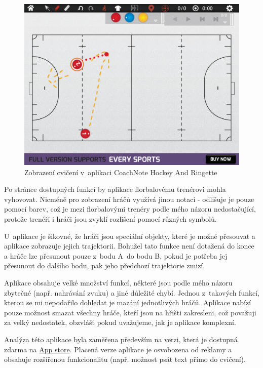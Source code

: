 \documentclass[thesis=B,czech]{FITthesis}[2012/06/26]
\begin{document}
	\begin{figure}[h!t]
		\centering
		\includegraphics[width=\textwidth]{img/competition/coachnote/IMG_0011}
		\caption{Zobrazení cvičení v~aplikaci CoachNote Hockey And Ringette}
		\label{pic:coachnote_exercises}
	\end{figure}

	Po stránce dostupných funkcí by aplikace florbalovému trenérovi mohla vyhovovat. Nicméně pro zobrazení hráčů využívá jinou notaci \-- odlišuje je pouze pomocí barev, což je mezi florbalovými trenéry podle mého názoru nedostačující, protože trenéři i hráči jsou zvyklí rozlišení pomocí různých symbolů.

	U~aplikace je šikovné, že hráči jsou speciální objekty, které je možné přesouvat a aplikace zobrazuje jejich trajektorii. Bohužel tato funkce není dotažená do konce a hráče lze přesunout pouze z~bodu A~do bodu B, pokud je potřeba jej přesunout do dalšího bodu, pak jeho předchozí trajektorie zmizí.

	Aplikace obsahuje velké množství funkcí, některé jsou podle mého názoru zbytečné (např. nahrávání zvuku) a jiné důležité chybí. Jednou z~takových funkcí, kterou se mi nepodařilo dohledat je mazání jednotlivých hráčů. Aplikace nabízí pouze možnost smazat všechny hráče, kteří jsou na hřišti zakresleni, což považuji za velký nedostatek, obzvlášť pokud uvažujeme, jak je aplikace komplexní.

	Analýza této aplikace byla zaměřena především na verzi, která je dostupná zdarma na \href{https://itunes.apple.com/us/app/coachnote-hockey-ringette/id562205341?mt=8}{App store}. Placená verze aplikace je osvobozena od reklamy a obsahuje rozšířenou funkcionalitu (např. možnost psát text přímo do cvičení).
\end{document}
